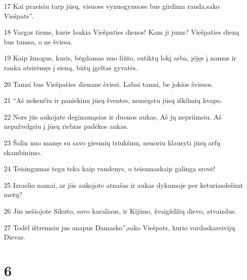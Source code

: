 \par 17 Kai praeisiu tarp jūsų, visuose vynuogynuose bus girdima rauda,­sako Viešpats”. 
\par 18 Vargas tiems, kurie laukia Viešpaties dienos! Kam ji jums? Viešpaties dieną bus tamsa, o ne šviesa. 
\par 19 Kaip žmogus, kuris, bėgdamas nuo liūto, sutiktų lokį arba, įėjęs į namus ir ranka atsirėmęs į sieną, būtų įgeltas gyvatės. 
\par 20 Tamsi bus Viešpaties diena­ne šviesi. Labai tamsi, be jokios šviesos. 
\par 21 “Aš nekenčiu ir paniekinu jūsų šventes, nemėgstu jūsų iškilmių kvapo. 
\par 22 Nors jūs aukojate deginamąsias ir duonos aukas, Aš jų nepriimsiu. Aš nepažvelgsiu į jūsų riebias padėkos aukas. 
\par 23 Šalin nuo manęs su savo giesmių triukšmu, nenoriu klausyti jūsų arfų skambinimo. 
\par 24 Teisingumas tegu teka kaip vandenys, o teisumas­kaip galinga srovė! 
\par 25 Izraelio namai, ar jūs aukojote atnašas ir aukas dykumoje per keturiasdešimt metų? 
\par 26 Jūs nešiojote Sikuto, savo karaliaus, ir Kijūno, žvaigždžių dievo, atvaizdus. 
\par 27 Todėl ištremsiu jus anapus Damasko”,­sako Viešpats, kurio vardas­kareivijų Dievas.



\chapter{6}


